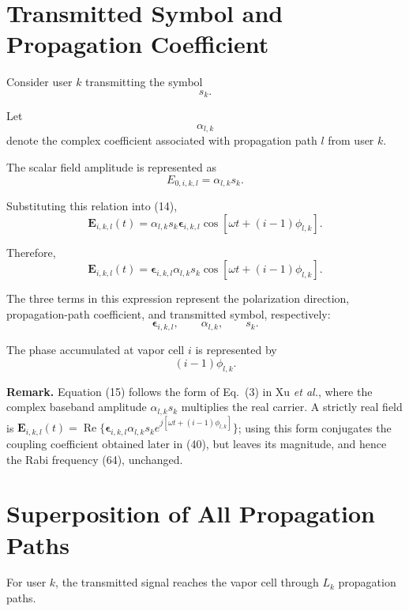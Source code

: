 \documentclass[12pt,a4paper]{article}
\begin{document}
\section{Transmitted Symbol and Propagation Coefficient}

Consider user \(k\) transmitting the symbol
\[
s_k.
\]

Let
\[
\alpha_{l,k}
\]
denote the complex coefficient associated with propagation path
\(l\) from user \(k\).

The scalar field amplitude is represented as
\[
E_{0,i,k,l}
=
\alpha_{l,k}s_k.
\]

Substituting this relation into (14),
\[
\mathbf E_{i,k,l}(t)
=
\alpha_{l,k}s_k
\boldsymbol{\epsilon}_{i,k,l}
\cos
\left[
\omega t+(i-1)\phi_{l,k}
\right].
\]

Therefore,
\begin{equation}
\boxed{
\mathbf E_{i,k,l}(t)
=
\boldsymbol{\epsilon}_{i,k,l}
\alpha_{l,k}s_k
\cos
\left[
\omega t+(i-1)\phi_{l,k}
\right].
}
\tag{15}
\end{equation}

The three terms in this expression represent the polarization
direction, propagation-path coefficient, and transmitted symbol,
respectively:
\[
\boldsymbol{\epsilon}_{i,k,l},
\qquad
\alpha_{l,k},
\qquad
s_k.
\]

The phase accumulated at vapor cell \(i\) is represented by
\[
(i-1)\phi_{l,k}.
\]

\textbf{Remark.} Equation (15) follows the form of Eq.~(3) in
Xu \emph{et al.}, where the complex baseband amplitude
$\alpha_{l,k}s_k$ multiplies the real carrier. A strictly real field is
$\mathbf E_{i,k,l}(t)=\operatorname{Re}\{\boldsymbol\epsilon_{i,k,l}\alpha_{l,k}s_k
e^{j[\omega t+(i-1)\phi_{l,k}]}\}$; using this form conjugates the
coupling coefficient obtained later in (40), but leaves its magnitude,
and hence the Rabi frequency (64), unchanged.

\section{Superposition of All Propagation Paths}

For user \(k\), the transmitted signal reaches the vapor cell
through \(L_k\) propagation paths.
\end{document}
